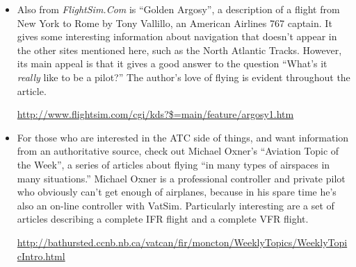 \begin{itemize}
%
%

%
%

%
%

\item Also from \textit{FlightSim.Com} is ``Golden Argosy'', a
  description of a flight from New York to Rome by Tony Vallillo, an
  American Airlines 767 captain.  It gives some interesting
  information about navigation that doesn't appear in the other sites
  mentioned here, such as the North Atlantic Tracks.  However, its
  main appeal is that it gives a good answer to the question ``What's
  it \emph{really} like to be a pilot?''  The author's love of flying
  is evident throughout the article.

\url{http://www.flightsim.com/cgi/kds?$=main/feature/argosy1.htm}

\item For those who are interested in the ATC side of things, and want
  information from an authoritative source, check out Michael Oxner's
  ``Aviation Topic of the Week'', a series of articles about flying
  ``in many types of airspaces in many situations.''  Michael Oxner is
  a professional controller and private pilot who obviously can't get
  enough of airplanes, because in his spare time he's also an on-line
  controller with VatSim.  Particularly interesting are a set of
  articles describing a complete IFR flight and a complete VFR flight.

  \url{http://bathursted.ccnb.nb.ca/vatcan/fir/moncton/WeeklyTopics/WeeklyTopicIntro.html}


\end{itemize}
